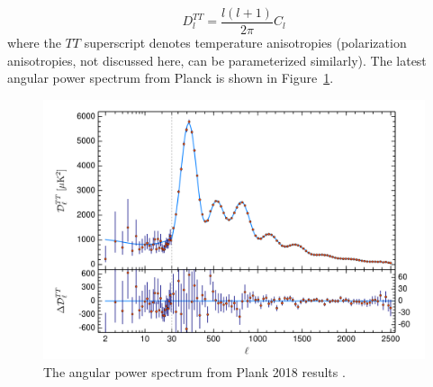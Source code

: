 \begin{equation}
D_{l}^{TT} = \frac{ l(l + 1)}{ 2 \pi} C_{l}
\end{equation}
where the $TT$ superscript denotes temperature anisotropies (polarization anisotropies, not discussed here, can be parameterized similarly). The latest angular power spectrum from Planck is shown in Figure~\ref{fig:planck_multipole}.

\begin{figure}[htbp]
\begin{center}
\includegraphics[width=\textwidth]{figures/theory/planck_multipole.png}
\caption{The angular power spectrum from Plank 2018 results  \cite{Planck2018}. }
\label{fig:planck_multipole}
\end{center}
\end{figure}

